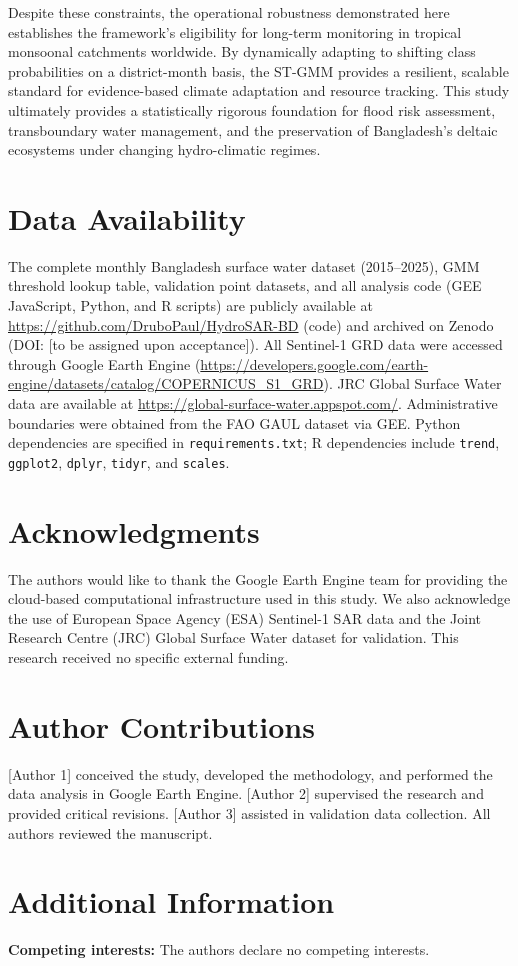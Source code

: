 \documentclass[fleqn,10pt,twocolumn]{article}
\begin{document}
Despite these constraints, the operational robustness demonstrated here establishes the framework's eligibility for long-term monitoring in tropical monsoonal catchments worldwide. By dynamically adapting to shifting class probabilities on a district-month basis, the ST-GMM provides a resilient, scalable standard for evidence-based climate adaptation and resource tracking. This study ultimately provides a statistically rigorous foundation for flood risk assessment, transboundary water management, and the preservation of Bangladesh's deltaic ecosystems under changing hydro-climatic regimes.


\section*{Data Availability}
The complete monthly Bangladesh surface water dataset (2015--2025), GMM threshold lookup table, validation point datasets, and all analysis code (GEE JavaScript, Python, and R scripts) are publicly available at \url{https://github.com/DruboPaul/HydroSAR-BD} (code) and archived on Zenodo (DOI: [to be assigned upon acceptance]). All Sentinel-1 GRD data were accessed through Google Earth Engine (\url{https://developers.google.com/earth-engine/datasets/catalog/COPERNICUS_S1_GRD}). JRC Global Surface Water data are available at \url{https://global-surface-water.appspot.com/}. Administrative boundaries were obtained from the FAO GAUL dataset via GEE. Python dependencies are specified in \texttt{requirements.txt}; R dependencies include \texttt{trend}, \texttt{ggplot2}, \texttt{dplyr}, \texttt{tidyr}, and \texttt{scales}.


\section*{Acknowledgments}
The authors would like to thank the Google Earth Engine team for providing the cloud-based computational infrastructure used in this study. We also acknowledge the use of European Space Agency (ESA) Sentinel-1 SAR data and the Joint Research Centre (JRC) Global Surface Water dataset for validation. This research received no specific external funding.


\section*{Author Contributions}
[Author 1] conceived the study, developed the methodology, and performed the data analysis in Google Earth Engine. [Author 2] supervised the research and provided critical revisions. [Author 3] assisted in validation data collection. All authors reviewed the manuscript.

\section*{Additional Information}
\textbf{Competing interests:} The authors declare no competing interests.



\end{document}
